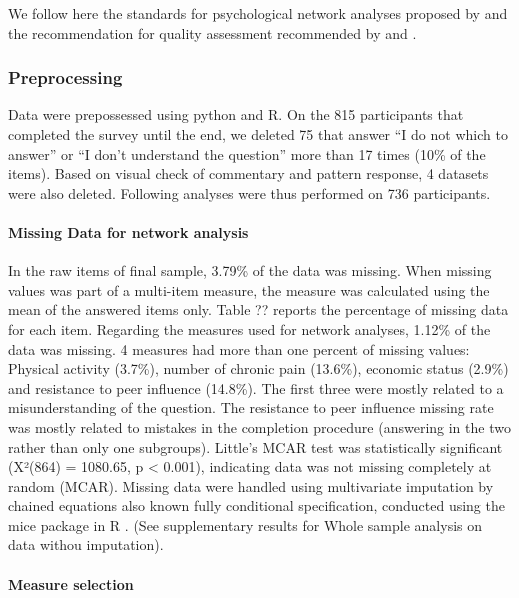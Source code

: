 \documentclass[preprint, 3p,
authoryear]{elsarticle} %
\begin{document}
We follow here the standards for psychological network analyses proposed
by \citet{burger_reporting_2022} and the recommendation for quality
assessment recommended by \citet{tomei_network_2022} and
\citet{monteleone_systematic_2021}.

\hypertarget{preprocessing}{%
\subsubsection{Preprocessing}\label{preprocessing}}

Data were prepossessed using python and R. On the 815 participants that
completed the survey until the end, we deleted 75 that answer ``I do not
which to answer'' or ``I don't understand the question'' more than 17
times (10\% of the items). Based on visual check of commentary and
pattern response, 4 datasets were also deleted. Following analyses were
thus performed on 736 participants.

\hypertarget{missing-data-for-network-analysis}{%
\paragraph{Missing Data for network
analysis}\label{missing-data-for-network-analysis}}

In the raw items of final sample, 3.79\% of the data was missing. When
missing values was part of a multi-item measure, the measure was
calculated using the mean of the answered items only. Table ?? reports
the percentage of missing data for each item. Regarding the measures
used for network analyses, 1.12\% of the data was missing. 4 measures
had more than one percent of missing values: Physical activity (3.7\%),
number of chronic pain (13.6\%), economic status (2.9\%) and resistance
to peer influence (14.8\%). The first three were mostly related to a
misunderstanding of the question. The resistance to peer influence
missing rate was mostly related to mistakes in the completion procedure
(answering in the two rather than only one subgroups). Little's MCAR
test was statistically significant (X²(864) = 1080.65, p \textless{}
0.001), indicating data was not missing completely at random (MCAR).
Missing data were handled using multivariate imputation by chained
equations also known fully conditional specification, conducted using
the mice package in R \citep{buuren_mice_2011}. (See supplementary
results for Whole sample analysis on data withou imputation).

\hypertarget{measure-selection}{%
\paragraph{Measure selection}\label{measure-selection}}
\end{document}
